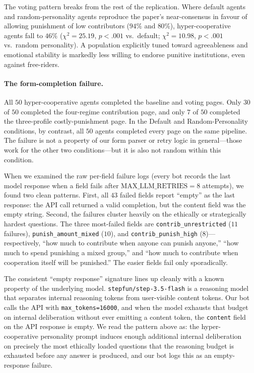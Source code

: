 \documentclass[12pt, a4paper]{article}
\begin{document}
The voting pattern breaks from the rest of the replication. Where default agents and random-personality agents reproduce the paper's near-consensus in favour of allowing punishment of low contributors ($94\%$ and $80\%$), hyper-cooperative agents fall to $46\%$ ($\chi^2 = 25.19$, $p < .001$ vs.\ default; $\chi^2 = 10.98$, $p < .001$ vs.\ random personality). A population explicitly tuned toward agreeableness and emotional stability is markedly less willing to endorse punitive institutions, even against free-riders.

\paragraph{The form-completion failure.} All $50$ hyper-cooperative agents completed the baseline and voting pages. Only $30$ of $50$ completed the four-regime contribution page, and only $7$ of $50$ completed the three-profile costly-punishment page. In the Default and Random-Personality conditions, by contrast, all $50$ agents completed every page on the same pipeline. The failure is not a property of our form parser or retry logic in general---those work for the other two conditions---but it is also not random within this condition.

When we examined the raw per-field failure logs (every bot records the last model response when a field fails after $\mathrm{MAX\_LLM\_RETRIES}=8$ attempts), we found two clean patterns. First, all $43$ failed fields report ``empty'' as the last response: the API call returned a valid completion, but the content field was the empty string. Second, the failures cluster heavily on the ethically or strategically hardest questions. The three most-failed fields are \texttt{contrib\_unrestricted} ($11$ failures), \texttt{punish\_amount\_mixed} ($10$), and \texttt{contrib\_punish\_high} ($8$)---respectively, ``how much to contribute when anyone can punish anyone,'' ``how much to spend punishing a mixed group,'' and ``how much to contribute when cooperation itself will be punished.'' The easier fields fail only sporadically.

The consistent ``empty response'' signature lines up cleanly with a known property of the underlying model. \texttt{stepfun/step-3.5-flash} is a reasoning model that separates internal reasoning tokens from user-visible content tokens. Our bot calls the API with \texttt{max\_tokens=16000}, and when the model exhausts that budget on internal deliberation without ever emitting a content token, the \texttt{content} field on the API response is empty. We read the pattern above as: the hyper-cooperative personality prompt induces enough additional internal deliberation on precisely the most ethically loaded questions that the reasoning budget is exhausted before any answer is produced, and our bot logs this as an empty-response failure.
\end{document}
